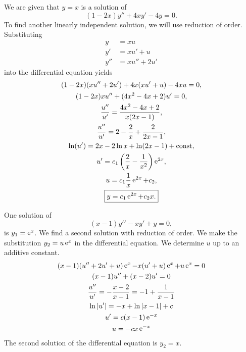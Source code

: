 {%
\begin{Solution}
  \label{solution 1-2xy+4xy-4y}
  We are given that $y = x$ is a solution of
  \[ 
  (1 - 2 x) y'' + 4 x y' - 4 y = 0.
  \]
  To find another linearly independent solution, we will use reduction of 
  order.  Substituting 
  \begin{align*}
    y &= x u \\
    y' &= x u' + u \\
    y'' &= x u'' + 2 u'
  \end{align*}
  into the differential equation yields
  \begin{gather*}
    (1 - 2 x) (x u'' + 2 u') + 4 x (x u' + u) - 4 x u = 0, \\
    (1 - 2 x) x u'' + (4 x^2 - 4 x + 2) u' = 0, \\
    \frac{u''}{u'} = \frac{4 x^2 - 4 x + 2}{x (2 x - 1)}, \\
    \frac{u''}{u'} = 2 - \frac{2}{x} + \frac{2}{2 x - 1}, \\
    \ln(u') = 2 x - 2 \ln x + \ln(2 x - 1) + \mathrm{const}, \\
    u' = c_1 \left( \frac{2}{x} - \frac{1}{x^2} \right) \mathop{\mathrm{e}}\nolimits^{2 x}, \\
    u = c_1 \frac{1}{x} \mathop{\mathrm{e}}\nolimits^{2 x} + c_2, \\
    \boxed{
      y = c_1 \mathop{\mathrm{e}}\nolimits^{2 x} + c_2 x.
      }
  \end{gather*}
\end{Solution}






\begin{Solution}
  \label{solution (x-1)y-xy+y=0}
  One solution of
  \[ 
  (x-1) y\prime\prime - x y\prime + y = 0, 
  \]
  is $y_1 = \mathop{\mathrm{e}}\nolimits^x$.  We find a second solution with reduction of order.  We 
  make the substitution $y_2 = u \mathop{\mathrm{e}}\nolimits^x$ in the differential equation.
  We determine $u$ up to an additive constant.
  \begin{gather*}
    (x - 1) (u'' + 2 u' + u) \mathop{\mathrm{e}}\nolimits^x - x (u' + u) \mathop{\mathrm{e}}\nolimits^x + u \mathop{\mathrm{e}}\nolimits^x = 0
    \\
    (x - 1) u'' + (x - 2) u' = 0
    \\
    \frac{u''}{u'} = - \frac{x - 2}{x - 1} = -1 + \frac{1}{x - 1}
    \\
    \ln | u' | = - x + \ln |x-1| + c
    \\
    u' = c (x - 1) \mathop{\mathrm{e}}\nolimits^{-x}
    \\
    u = -c x \mathop{\mathrm{e}}\nolimits^{-x}
  \end{gather*}
  The second solution of the differential equation is $y_2 = x$.
\end{Solution}







}
